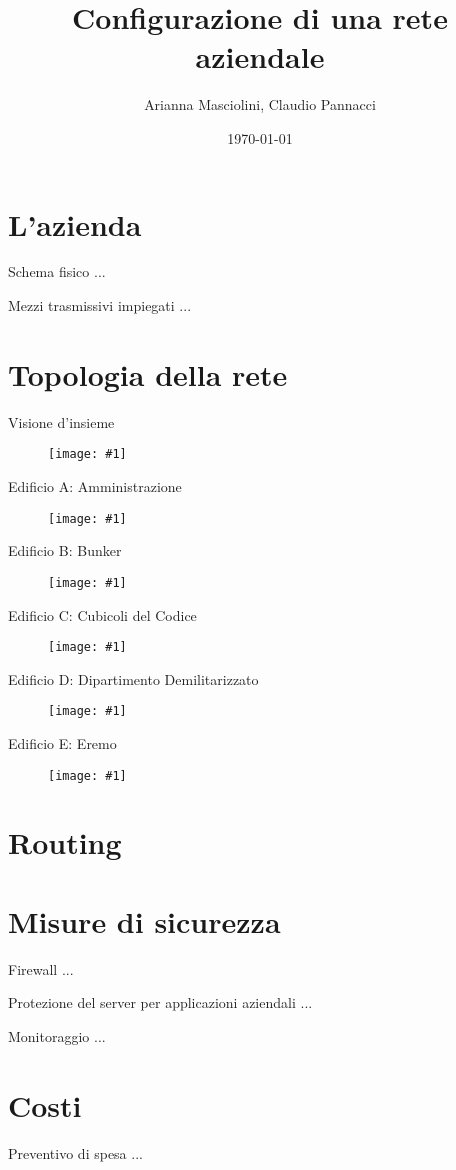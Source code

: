 \documentclass{beamer}
\title{Configurazione di una rete aziendale}
\date{\today}
\author{Arianna Masciolini, Claudio Pannacci}
\institute{Università degli Studi di Perugia}
\def\image[#1][#2]{
  \begin{figure}[H]
  \centering
  \texttt{[image: \#1]}
  \end{figure}}
\begin{document}
  \maketitle
  \section{L'azienda}
  	\begin{frame}{Schema fisico}
    	...
  	\end{frame}
  	\begin{frame}{Mezzi trasmissivi impiegati}
  		...
  	\end{frame}
  \section{Topologia della rete}
  	\begin{frame}{Visione d'insieme}
  		\image[disditta.png][scale=0.30]
  	\end{frame}
  	\begin{frame}{Edificio A: Amministrazione}
  		\image[ed_a.png][scale=0.50]
  	\end{frame}
  	\begin{frame}{Edificio B: Bunker}
  		\image[ed_b.png][scale=0.50]
  	\end{frame}
  	\begin{frame}{Edificio C: Cubicoli del Codice}
  		\image[ed_c.png][scale=0.50]
  	\end{frame}
  	\begin{frame}{Edificio D: Dipartimento Demilitarizzato}
  		\image[ed_d.png][scale=0.50]
  	\end{frame}
  	\begin{frame}{Edificio E: Eremo}
  		\image[ed_e.png][scale=0.50]
  	\end{frame}
  \section{Routing}
  \section{Misure di sicurezza}
  	\begin{frame}{Firewall}
  		...
  	\end{frame}
  	\begin{frame}{Protezione del server per applicazioni aziendali}
  		...
  	\end{frame}
  	\begin{frame}{Monitoraggio}
  		...
  	\end{frame}
  \section{Costi}
  \begin{frame}{Preventivo di spesa}
  		...
  	\end{frame}
\end{document}
